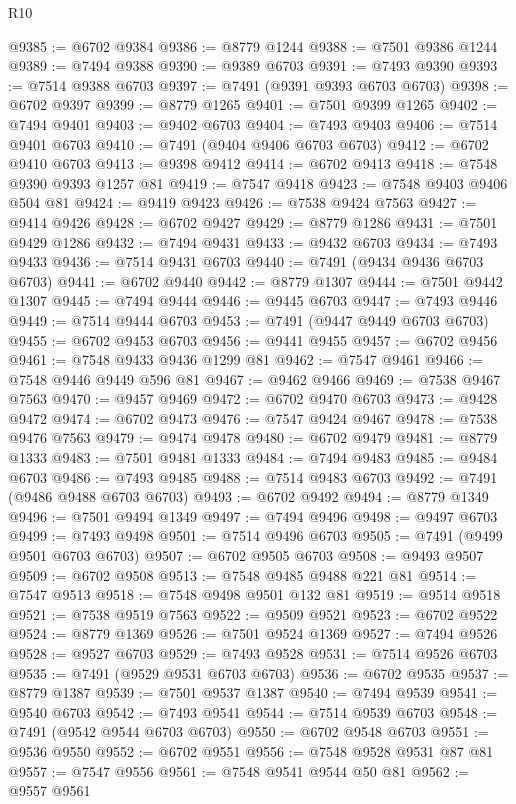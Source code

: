 \begin{lexlean}{R10}
\begin{coremodule}
@9385 := @6702 @9384
@9386 := @8779 @1244
@9388 := @7501 @9386 @1244
@9389 := @7494 @9388
@9390 := @9389 @6703
@9391 := @7493 @9390
@9393 := @7514 @9388 @6703
@9397 := @7491 (@9391 @9393 @6703 @6703)
@9398 := @6702 @9397
@9399 := @8779 @1265
@9401 := @7501 @9399 @1265
@9402 := @7494 @9401
@9403 := @9402 @6703
@9404 := @7493 @9403
@9406 := @7514 @9401 @6703
@9410 := @7491 (@9404 @9406 @6703 @6703)
@9412 := @6702 @9410 @6703
@9413 := @9398 @9412
@9414 := @6702 @9413
@9418 := @7548 @9390 @9393 @1257 @81
@9419 := @7547 @9418
@9423 := @7548 @9403 @9406 @504 @81
@9424 := @9419 @9423
@9426 := @7538 @9424 @7563
@9427 := @9414 @9426
@9428 := @6702 @9427
@9429 := @8779 @1286
@9431 := @7501 @9429 @1286
@9432 := @7494 @9431
@9433 := @9432 @6703
@9434 := @7493 @9433
@9436 := @7514 @9431 @6703
@9440 := @7491 (@9434 @9436 @6703 @6703)
@9441 := @6702 @9440
@9442 := @8779 @1307
@9444 := @7501 @9442 @1307
@9445 := @7494 @9444
@9446 := @9445 @6703
@9447 := @7493 @9446
@9449 := @7514 @9444 @6703
@9453 := @7491 (@9447 @9449 @6703 @6703)
@9455 := @6702 @9453 @6703
@9456 := @9441 @9455
@9457 := @6702 @9456
@9461 := @7548 @9433 @9436 @1299 @81
@9462 := @7547 @9461
@9466 := @7548 @9446 @9449 @596 @81
@9467 := @9462 @9466
@9469 := @7538 @9467 @7563
@9470 := @9457 @9469
@9472 := @6702 @9470 @6703
@9473 := @9428 @9472
@9474 := @6702 @9473
@9476 := @7547 @9424 @9467
@9478 := @7538 @9476 @7563
@9479 := @9474 @9478
@9480 := @6702 @9479
@9481 := @8779 @1333
@9483 := @7501 @9481 @1333
@9484 := @7494 @9483
@9485 := @9484 @6703
@9486 := @7493 @9485
@9488 := @7514 @9483 @6703
@9492 := @7491 (@9486 @9488 @6703 @6703)
@9493 := @6702 @9492
@9494 := @8779 @1349
@9496 := @7501 @9494 @1349
@9497 := @7494 @9496
@9498 := @9497 @6703
@9499 := @7493 @9498
@9501 := @7514 @9496 @6703
@9505 := @7491 (@9499 @9501 @6703 @6703)
@9507 := @6702 @9505 @6703
@9508 := @9493 @9507
@9509 := @6702 @9508
@9513 := @7548 @9485 @9488 @221 @81
@9514 := @7547 @9513
@9518 := @7548 @9498 @9501 @132 @81
@9519 := @9514 @9518
@9521 := @7538 @9519 @7563
@9522 := @9509 @9521
@9523 := @6702 @9522
@9524 := @8779 @1369
@9526 := @7501 @9524 @1369
@9527 := @7494 @9526
@9528 := @9527 @6703
@9529 := @7493 @9528
@9531 := @7514 @9526 @6703
@9535 := @7491 (@9529 @9531 @6703 @6703)
@9536 := @6702 @9535
@9537 := @8779 @1387
@9539 := @7501 @9537 @1387
@9540 := @7494 @9539
@9541 := @9540 @6703
@9542 := @7493 @9541
@9544 := @7514 @9539 @6703
@9548 := @7491 (@9542 @9544 @6703 @6703)
@9550 := @6702 @9548 @6703
@9551 := @9536 @9550
@9552 := @6702 @9551
@9556 := @7548 @9528 @9531 @87 @81
@9557 := @7547 @9556
@9561 := @7548 @9541 @9544 @50 @81
@9562 := @9557 @9561

\end{coremodule}
\end{lexlean}
